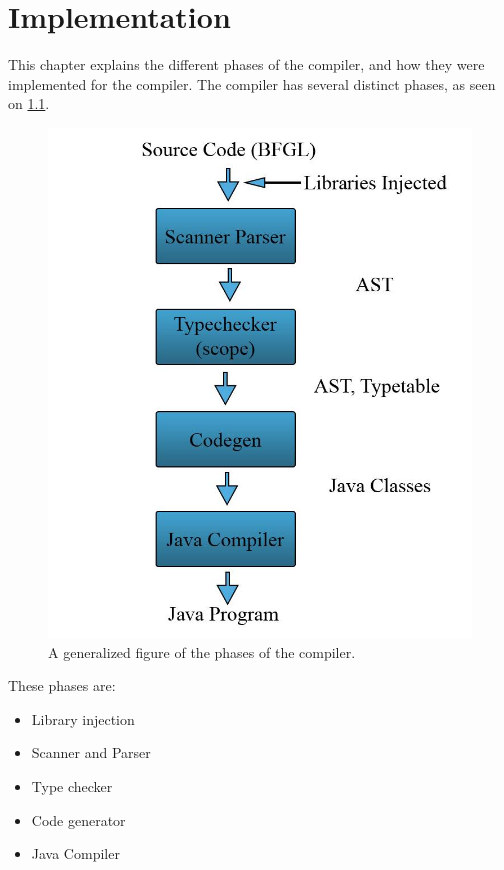 \chapter{Implementation}
This chapter explains the different phases of the \lang{} compiler, and how they were implemented for the \lang{} compiler. The \lang{} compiler has several distinct phases, as seen on \ref{fig:compphase}. 


\begin{figure}[H]
    \centering
    \includegraphics[scale=0.5]{resources/Images/compiler-phase.jpeg}
    \caption{A generalized figure of the phases of the \lang{} compiler.}
    \label{fig:compphase}
\end{figure}

These phases are:

\begin{itemize}
    \item Library injection
    \item Scanner and Parser
    \item Type checker
    \item Code generator
    \item Java Compiler
\end{itemize}

